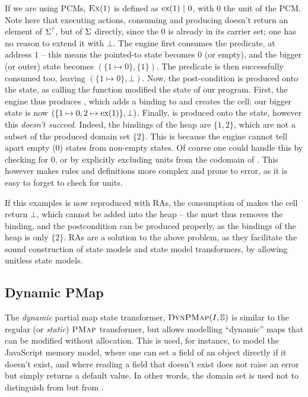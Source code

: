 If we are using PCMs, $\textsc{Ex}({1})$ is defined as $\text{ex}(1)~|~0$, with $0$ the unit of the PCM. Note here that executing actions, consuming and producing doesn't return an element of $\Sigma^?$, but of $\Sigma$ directly, since the $0$ is already in its carrier set; one has no reason to extend it with $\bot$. The engine first consumes the \exP{} predicate, at address $1$ -- this means the pointed-to state becomes $0$ (or empty), and the bigger (or outer) state becomes $(\{ 1\mapsto 0\}, \{ 1\})$. The \domainset{} predicate is then successfully consumed too, leaving $(\{ 1\mapsto 0\},\bot)$. Now, the post-condition is produced onto the state, as calling the function modified the state of our program. First, the engine thus produces , which adds a binding to \PMap{} and creates the cell: our bigger state is now $(\{ 1\mapsto 0, 2\mapsto \text{ex}(1)\},\bot)$. Finally,  is produced onto the state, however this \emph{doesn't succeed}. Indeed, the bindings of the heap are $\{1,2\}$, which are not a subset of the produced domain set $\{2\}$. This is because the engine cannot tell apart empty ($0$) states from non-empty states. Of course one could handle this by checking for $0$, or by explicitly excluding units from the codomain of \PMap{}. This however makes rules and definitions more complex and prone to error, as it is easy to forget to check for units.

If this examples is now reproduced with RAs, the consumption of  makes the cell return $\bot$, which cannot be added into the heap -- the \PMap{} must thus removes the binding, and the postcondition can be produced properly, as the bindings of the heap is only $\{2\}$. RAs are a solution to the above problem, as they facilitate the sound construction of state models and state model transformers, by allowing unitless state models.

\subsection{Dynamic PMap}

The \emph{dynamic} partial map state transformer, $\textsc{DynPMap}(I,\mathbb S)$ is similar to the regular (or \emph{static}) $\textsc{PMap}$ transformer, but allows modelling ``dynamic'' maps that can be modified without allocation. This is used, for instance, to model the JavaScript memory model, where one can set a field of an object directly if it doesn't exist, and where reading a field that doesn't exist does not raise an error but simply returns a default  value. In other words, the domain set is used not to distinguish \Miss{} from \Err{} but \Miss{} from \Ok{}.

